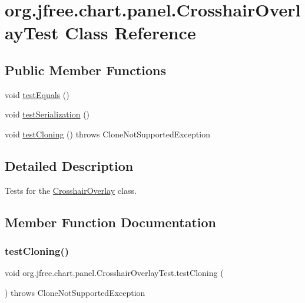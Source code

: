 \hypertarget{classorg_1_1jfree_1_1chart_1_1panel_1_1_crosshair_overlay_test}{}\section{org.\+jfree.\+chart.\+panel.\+Crosshair\+Overlay\+Test Class Reference}
\label{classorg_1_1jfree_1_1chart_1_1panel_1_1_crosshair_overlay_test}
\subsection*{Public Member Functions}
\begin{DoxyCompactItemize}
\item 
void \mbox{\hyperlink{classorg_1_1jfree_1_1chart_1_1panel_1_1_crosshair_overlay_test_a38babfdf3ce97fa9c4d2d19e62dec939}{test\+Equals}} ()
\item 
void \mbox{\hyperlink{classorg_1_1jfree_1_1chart_1_1panel_1_1_crosshair_overlay_test_aad0a1900f50a8dbd69767b68e25a647b}{test\+Serialization}} ()
\item 
void \mbox{\hyperlink{classorg_1_1jfree_1_1chart_1_1panel_1_1_crosshair_overlay_test_a25485d99bad5d450190a0d4c4e1eaeee}{test\+Cloning}} ()  throws Clone\+Not\+Supported\+Exception 
\end{DoxyCompactItemize}


\subsection{Detailed Description}
Tests for the \mbox{\hyperlink{classorg_1_1jfree_1_1chart_1_1panel_1_1_crosshair_overlay}{Crosshair\+Overlay}} class. 

\subsection{Member Function Documentation}
\mbox{\label{classorg_1_1jfree_1_1chart_1_1panel_1_1_crosshair_overlay_test_a25485d99bad5d450190a0d4c4e1eaeee}} 
\subsubsection{\texorpdfstring{test\+Cloning()}{testCloning()}}
{\footnotesize\ttfamily void org.\+jfree.\+chart.\+panel.\+Crosshair\+Overlay\+Test.\+test\+Cloning (\begin{DoxyParamCaption}{ }\end{DoxyParamCaption}) throws Clone\+Not\+Supported\+Exception}

